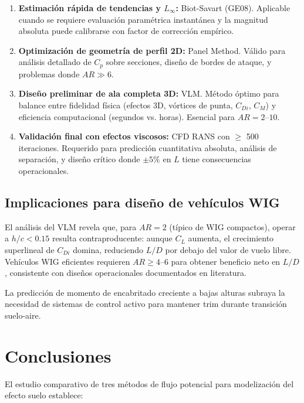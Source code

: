 \documentclass[twocolumn]{article}
\begin{document}
\begin{enumerate}
    \item \textbf{Estimación rápida de tendencias y $L_\infty$:} Biot-Savart (GE08). Aplicable cuando se requiere evaluación paramétrica instantánea y la magnitud absoluta puede calibrarse con factor de corrección empírico.
    
    \item \textbf{Optimización de geometría de perfil 2D:} Panel Method. Válido para análisis detallado de $C_p$ sobre secciones, diseño de bordes de ataque, y problemas donde $AR \gg 6$.
    
    \item \textbf{Diseño preliminar de ala completa 3D:} VLM. Método óptimo para balance entre fidelidad física (efectos 3D, vórtices de punta, $C_{Di}$, $C_M$) y eficiencia computacional (segundos vs. horas). Esencial para $AR = 2$--$10$.
    
    \item \textbf{Validación final con efectos viscosos:} CFD RANS con $\geq$ 500 iteraciones. Requerido para predicción cuantitativa absoluta, análisis de separación, y diseño crítico donde $\pm 5\%$ en $L$ tiene consecuencias operacionales.
\end{enumerate}

\subsection{Implicaciones para diseño de vehículos WIG}

El análisis del VLM revela que, para $AR = 2$ (típico de WIG compactos), operar a $h/c < 0.15$ resulta contraproducente: aunque $C_L$ aumenta, el crecimiento superlineal de $C_{Di}$ domina, reduciendo $L/D$ por debajo del valor de vuelo libre. Vehículos WIG eficientes requieren $AR \geq 4$--$6$ para obtener beneficio neto en $L/D$, consistente con diseños operacionales documentados en literatura.

La predicción de momento de encabritado creciente a bajas alturas subraya la necesidad de sistemas de control activo para mantener trim durante transición suelo-aire.

\section{Conclusiones}

El estudio comparativo de tres métodos de flujo potencial para modelización del efecto suelo establece:
\end{document}
